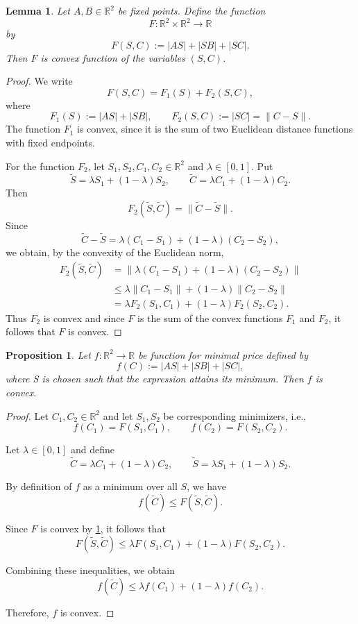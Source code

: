 \documentclass[openany]{book}
\newtheorem{proposition}{Proposition}
\newtheorem{lemma}{Lemma}
\begin{document}
	\begin{lemma}\label{lem:Fconvex}
		Let \(A,B \in \mathbb{R}^2\) be fixed points. Define the function
		\[
		F : \mathbb{R}^2 \times \mathbb{R}^2 \to \mathbb{R}
		\]
		by
		\[
		F(S,C) := |AS| + |SB| + |SC|.
		\]
		Then \(F\) is convex function of the variables \((S,C)\).
	\end{lemma}
	
	\begin{proof}
		We write
		\[
		F(S,C)=F_1(S)+F_2(S,C),
		\]
		where
		\[
		F_1(S):=|AS|+|SB|,
		\qquad
		F_2(S,C):=|SC|=\|C-S\|.
		\]
		The function \(F_1\) is convex, since it is the sum of two Euclidean distance
		functions with fixed endpoints.

		For the function \(F_2\), let \(S_1,S_2,C_1,C_2\in\mathbb{R}^2\) and
		\(\lambda\in[0,1]\). Put
		\[
		\widetilde S=\lambda S_1+(1-\lambda)S_2,
		\qquad
		\widetilde C=\lambda C_1+(1-\lambda)C_2.
		\]
		Then
		\[
		F_2(\widetilde S,\widetilde C)
		=
		\|\widetilde C-\widetilde S\|.
		\]
		Since
		\[
		\widetilde C-\widetilde S
		=
		\lambda(C_1-S_1)+(1-\lambda)(C_2-S_2),
		\]
		we obtain, by the convexity of the Euclidean norm,
		\[
		\begin{aligned}
			F_2(\widetilde S,\widetilde C)
			&=
			\|\lambda(C_1-S_1)+(1-\lambda)(C_2-S_2)\| \\
			&\leq
			\lambda\|C_1-S_1\|+(1-\lambda)\|C_2-S_2\| \\
			&=
			\lambda F_2(S_1,C_1)+(1-\lambda)F_2(S_2,C_2).
		\end{aligned}
		\]
		Thus \(F_2\) is convex and since \(F\) is the sum of the convex functions \(F_1\) and \(F_2\), it follows
		that \(F\) is convex.
	\end{proof}

	\begin{proposition}\label{prop:f_convex}
		Let \(f : \mathbb{R}^2 \to \mathbb{R}\) be function for minimal price defined by
		\[
		f(C) := |AS| + |SB| + |SC|,
		\]
		where S is chosen such that the expression attains its minimum.
		Then \(f\) is convex.
	\end{proposition}
	\begin{proof}
		Let \(C_1, C_2 \in \mathbb{R}^2\) and let \(S_1, S_2\) be corresponding
		minimizers, i.e.,
		\[
		f(C_1) = F(S_1, C_1), \qquad f(C_2) = F(S_2, C_2).
		\]
		
		Let \(\lambda \in [0,1]\) and define
		\[
		\widetilde C = \lambda C_1 + (1-\lambda) C_2,
		\qquad
		\widetilde S = \lambda S_1 + (1-\lambda) S_2.
		\]
		
		By definition of \(f\) as a minimum over all \(S\), we have
		\[
		f(\widetilde C)
		\leq
		F(\widetilde S, \widetilde C).
		\]
		
		Since \(F\) is convex by \cref{lem:Fconvex}, it follows that
		\[
		F(\widetilde S, \widetilde C)
		\leq
		\lambda F(S_1,C_1) + (1-\lambda)F(S_2,C_2).
		\]
		
		Combining these inequalities, we obtain
		\[
		f(\widetilde C)
		\leq
		\lambda f(C_1) + (1-\lambda)f(C_2).
		\]
		
		Therefore, \(f\) is convex.
	\end{proof}
\end{document}
